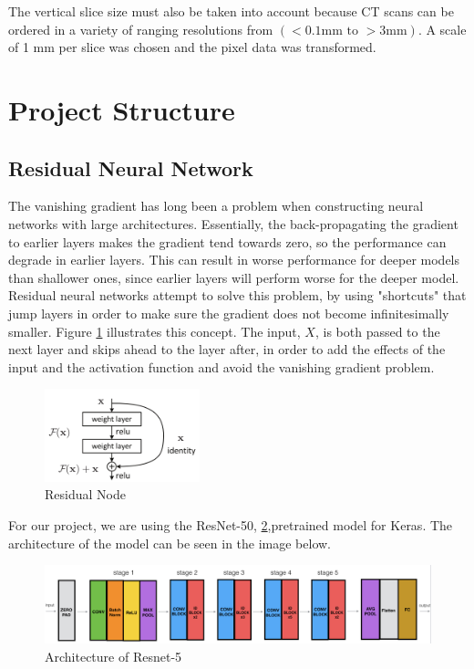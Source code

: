 \documentclass[10pt,twocolumn,letterpaper]{article}
\begin{document}
         The vertical slice size must also be taken into account because CT scans can be ordered in a variety of
         ranging resolutions from $(<0.1\text{mm to } >3 \text{mm})$. A scale of 1 mm per slice was chosen and the
         pixel data was transformed.

\section{Project Structure} \label{sec:struct}

   \subsection{Residual Neural Network} \label{sec:struct-cnn}
        The vanishing gradient has long been a problem when constructing neural networks with large architectures. Essentially, the back-propagating the gradient to earlier layers makes the gradient tend towards zero, so the performance can degrade in earlier layers. This can result in worse performance for deeper models than shallower ones, since earlier layers will perform worse for the deeper model. Residual neural networks attempt to solve this problem, by using "shortcuts" that jump layers in order to make sure the gradient does not become infinitesimally smaller. Figure \ref{fig:struct-cnn-residual} illustrates this concept. The input, $X$, is both passed to the next layer and skips ahead to the layer after, in order to add the effects of the input and the activation function and avoid the vanishing gradient problem.

        \begin{figure}[h]
            \centering
            \includegraphics[width=0.4\textwidth]{./images/residual.png}
            \caption{Residual Node}
            \label{fig:struct-cnn-residual}
        \end{figure}

        For our project, we are using the ResNet-50, \ref{fig:struct-cnn-resnet},pretrained model for Keras. The architecture of the model can be seen in the image below.

        \begin{figure}
            \begin{center}
                \includegraphics[width=\textwidth]{./images/Resnet-50.png}
            \end{center}
               \caption{Architecture of Resnet-5}
            \label{fig:struct-cnn-resnet}
        \end{figure}
\end{document}
